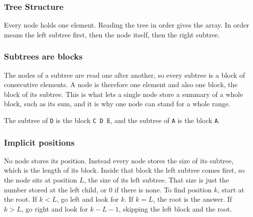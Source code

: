 \subsubsection{Tree Structure}
Every node holds one element. Reading the tree in order gives the array. In order means the left subtree first, then the node itself, then the right subtree.

\begin{center}
\end{center}

\subsubsection{Subtrees are blocks}
The nodes of a subtree are read one after another, so every subtree is a block of consecutive elements. A node is therefore one element and also one block, the block of its subtree. This is what lets a single node store a summary of a whole block, such as its sum, and it is why one node can stand for a whole range.

\begin{center}
\end{center}
The subtree of \texttt{D} is the block \texttt{C D E}, and the subtree of \texttt{A} is the block \texttt{A}.

\subsubsection{Implicit positions}
No node stores its position. Instead every node stores the size of its subtree, which is the length of its block. Inside that block the left subtree comes first, so the node sits at position \(L\), the size of its left subtree. That size is just the number stored at the left child, or \(0\) if there is none. To find position \(k\), start at the root. If \(k < L\), go left and look for \(k\). If \(k = L\), the root is the answer. If \(k > L\), go right and look for \(k - L - 1\), skipping the left block and the root.

